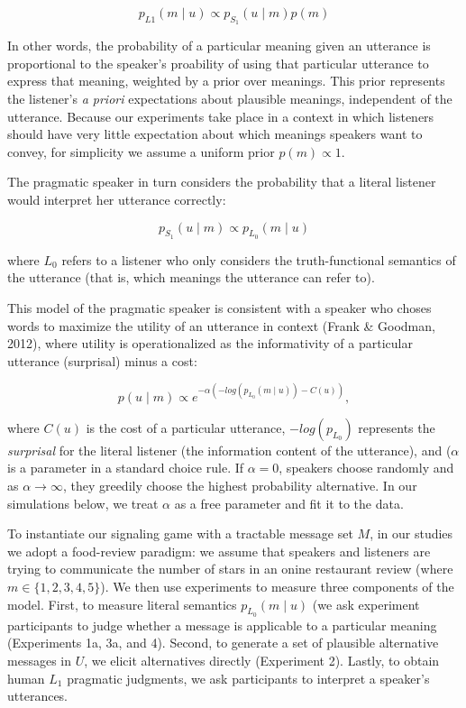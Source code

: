 \documentclass[10pt, letterpaper]{article}
\begin{document}
\[p_{L1}(m \mid u) \propto p_{S_1} (u \mid m) p(m)\]

\noindent In other words, the probability of a particular meaning given
an utterance is proportional to the speaker's proability of using that
particular utterance to express that meaning, weighted by a prior over
meanings. This prior represents the listener's \emph{a priori}
expectations about plausible meanings, independent of the utterance.
Because our experiments take place in a context in which listeners
should have very little expectation about which meanings speakers want
to convey, for simplicity we assume a uniform prior \(p(m) \propto 1\).

The pragmatic speaker in turn considers the probability that a literal
listener would interpret her utterance correctly:

\[ p_{S_1} (u \mid m) \propto p_{L_0} (m \mid u)\]

\noindent where \(L_0\) refers to a listener who only considers the
truth-functional semantics of the utterance (that is, which meanings the
utterance can refer to).

This model of the pragmatic speaker is consistent with a speaker who
choses words to maximize the utility of an utterance in context (Frank
\& Goodman, 2012), where utility is operationalized as the informativity
of a particular utterance (surprisal) minus a cost:

\[p(u \mid m) \propto e^{-\alpha(-log(p_{L_0}(m \mid u)) - C(u))},\]

\noindent where \(C(u)\) is the cost of a particular utterance,
\(-log(p_{L_0})\) represents the \emph{surprisal} for the literal
listener (the information content of the utterance), and (\(\alpha\) is
a parameter in a standard choice rule. If \(\alpha=0\), speakers choose
randomly and as \(\alpha \rightarrow \infty\), they greedily choose the
highest probability alternative. In our simulations below, we treat
\(\alpha\) as a free parameter and fit it to the data.

To instantiate our signaling game with a tractable message set \(M\), in
our studies we adopt a food-review paradigm: we assume that speakers and
listeners are trying to communicate the number of stars in an onine
restaurant review (where \(m \in \{1, 2, 3, 4, 5\}\)). We then use
experiments to measure three components of the model. First, to measure
literal semantics \({p_{L_0} (m \mid u)}\) (we ask experiment
participants to judge whether a message is applicable to a particular
meaning (Experiments 1a, 3a, and 4). Second, to generate a set of
plausible alternative messages in \(U\), we elicit alternatives directly
(Experiment 2). Lastly, to obtain human \(L_1\) pragmatic judgments, we
ask participants to interpret a speaker's utterances.
\end{document}
